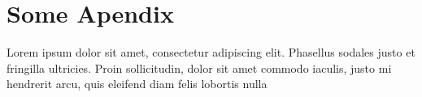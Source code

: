 \chapter{Some Apendix}

Lorem ipsum dolor sit amet, consectetur adipiscing elit. Phasellus sodales justo et fringilla ultricies. Proin sollicitudin, dolor sit amet commodo iaculis, justo mi hendrerit arcu, quis eleifend diam felis lobortis nulla 